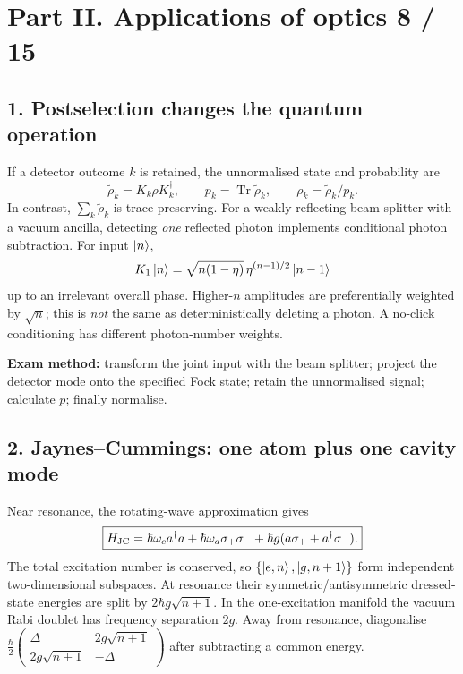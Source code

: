 
\section*{Part II. Applications of optics \hfill 8 / 15}
\subsection*{1. Postselection changes the quantum operation}
If a detector outcome \(k\) is retained, the unnormalised
state and probability are
\[
\tilde\rho_k=K_k\rho K_k^\dagger,\qquad
p_k=\operatorname{Tr}\tilde\rho_k,\qquad
\boxed{\rho_k=\tilde\rho_k/p_k.}
\]
In contrast, \(\sum_k\tilde\rho_k\) is trace-preserving.
For a weakly reflecting beam splitter with a vacuum ancilla,
detecting \emph{one} reflected photon implements
conditional photon subtraction. For input \(\left\lvert n\right\rangle\),
\[
K_{1}\left\lvert n\right\rangle=
\sqrt{n(1-\eta)}\,\eta^{(n-1)/2}\left\lvert n-1\right\rangle
\]
up to an irrelevant overall phase. Higher-\(n\) amplitudes
are preferentially weighted by \(\sqrt n\); this is
\emph{not} the same as deterministically deleting a photon.
A no-click conditioning has different photon-number weights.
\begin{methodbox}
\textbf{Exam method:} transform the joint input with the beam
splitter; project the detector mode onto the specified Fock
state; retain the unnormalised signal; calculate \(p\);
finally normalise.
\end{methodbox}

\subsection*{2. Jaynes--Cummings: one atom plus one cavity mode}
Near resonance, the rotating-wave approximation gives
\[
\boxed{H_{\rm JC}=\hbar\omega_c a^\dagger a+
\hbar\omega_a\sigma_+\sigma_-+
\hbar g(a\sigma_++a^\dagger\sigma_-).}
\]
The total excitation number is conserved, so
\(\{\left\lvert e,n\right\rangle,\left\lvert g,n+1\right\rangle\}\) form independent
two-dimensional subspaces. At resonance their
symmetric/antisymmetric dressed-state energies are split by
\(2\hbar g\sqrt{n+1}\). In the one-excitation manifold the
vacuum Rabi doublet has frequency separation \(2g\).
Away from resonance, diagonalise
\(\frac{\hbar}{2}\begin{pmatrix}\Delta&2g\sqrt{n+1}\\
2g\sqrt{n+1}&-\Delta\end{pmatrix}\)
after subtracting a common energy.

